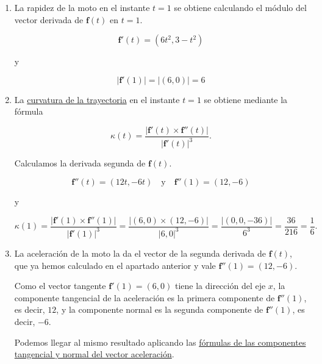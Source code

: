 \documentclass[
  spanish,
  a4paper,
]{scrreport}
\theoremstyle{definition}
\theoremstyle{remark}
\begin{document}
\begin{tcolorbox}[enhanced jigsaw, arc=.35mm, bottomrule=.15mm, bottomtitle=1mm, breakable, colback=white, colbacktitle=quarto-callout-tip-color!10!white, colframe=quarto-callout-tip-color-frame, coltitle=black, left=2mm, leftrule=.75mm, opacityback=0, opacitybacktitle=0.6, rightrule=.15mm, title=\textcolor{quarto-callout-tip-color}{\faLightbulb}\hspace{0.5em}{Solución}, titlerule=0mm, toprule=.15mm, toptitle=1mm]

\begin{enumerate}
\def\labelenumi{\alph{enumi}.}
\item
  La rapidez de la moto en el instante \(t=1\) se obtiene calculando el
  módulo del vector derivada de \(\mathbf{f}(t)\) en \(t=1\).

  \[
  \mathbf{f}'(t) = (6t^2, 3-t^2)
  \]

  y

  \[
  |\mathbf{f}'(1)| = |(6, 0)| = 6
  \]
\item
  La
  \href{https://aprendeconalf.es/analisis-manual/12-funciones-vectoriales.html\#thm-curvatura-trayectoria-espacio-real}{curvatura
  de la trayectoria} en el instante \(t=1\) se obtiene mediante la
  fórmula

  \[
  \kappa(t) = \frac{|\mathbf{f}'(t) \times \mathbf{f}''(t)|}{|\mathbf{f}'(t)|^3}.
  \]

  Calculamos la derivada segunda de \(\mathbf{f}(t)\).

  \[
  \mathbf{f}''(t) = (12t, -6t)\quad \mbox{y}\quad \mathbf{f}''(1) = (12, -6)
  \]

  y

  \[
  \kappa(1) 
  = \frac{|\mathbf{f}'(1) \times \mathbf{f}''(1)|}{|\mathbf{f}'(1)|^3} 
  = \frac{|(6, 0) \times (12, -6)|}{|6,0|^3} 
  = \frac{|(0, 0, -36)|}{6^3} 
  = \frac{36}{216}
  = \frac{1}{6}. 
  \]
\item
  La aceleración de la moto la da el vector de la segunda derivada de
  \(\mathbf{f}(t)\), que ya hemos calculado en el apartado anterior y
  vale \(\mathbf{f}''(1) = (12, -6)\).

  Como el vector tangente \(\mathbf{f}'(1) = (6, 0)\) tiene la dirección
  del eje \(x\), la componente tangencial de la aceleración es la
  primera componente de \(\mathbf{f}''(1)\), es decir, \(12\), y la
  componente normal es la segunda componente de \(\mathbf{f}''(1)\), es
  decir, \(-6\).

  Podemos llegar al mismo resultado aplicando las
  \href{https://aprendeconalf.es/analisis-manual/12-funciones-vectoriales.html\#def-componente-tangencial-normal-aceleracion}{fórmulas
  de las componentes tangencial y normal del vector aceleración}.


\end{enumerate}
\end{tcolorbox}
\end{document}
